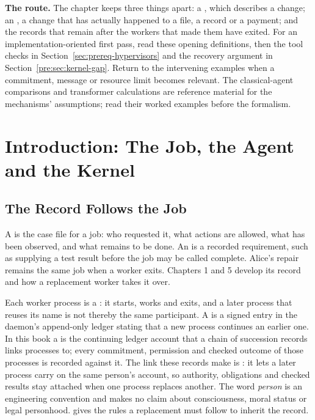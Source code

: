 \noindent\textbf{The route.}
The chapter keeps three things apart: a , which describes a
change; an , a change that has actually happened to a file, a
record or a payment; and the records that remain after the workers that made
them have exited. For an
implementation-oriented first pass, read these opening definitions, then the
tool checks in Section~\ref{sec:prereq-hypervisors} and the recovery
argument in Section~\ref{pre:sec:kernel-gap}. Return to the intervening examples
when a commitment, message or resource limit becomes relevant. The
classical-agent comparisons and transformer calculations are reference material
for the mechanisms' assumptions; read their worked examples before the formalism.

\ifdefined\pdswisslandmarkplate\clearpage\fi
\section{Introduction: The Job, the Agent and the Kernel}

\subsection{The Record Follows the Job}

A  is the case file for a job: who requested it, what actions
are allowed, what has been observed, and what remains to be done. An
 is a recorded requirement, such as supplying a test result
before the job may be called complete. Alice's repair remains the same job
when a worker exits. Chapters 1 and 5 develop its record and how a
replacement worker takes it over.

Each worker process is a : it starts, works and exits, and a
later process that reuses its name is not thereby the same participant. A
 is a signed entry in the daemon's append-only
ledger stating that a new process continues an earlier one. In this book a
 is the continuing ledger account that a chain of succession
records links processes to; every commitment, permission and checked outcome
of those processes is recorded against it. The link these records make is
: it lets a later process carry on the same person's
account, so authority, obligations and checked results stay attached when one
process replaces another. The word \emph{person} is an engineering convention
and makes no claim about consciousness, moral status or legal personhood.
 gives the rules a replacement must
follow to inherit the record.

